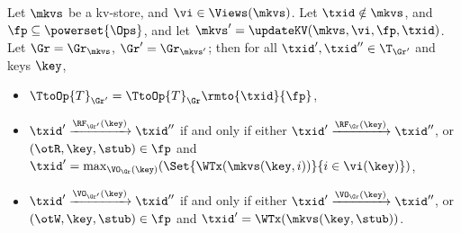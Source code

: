 \begin{lemma}
\label{lem:graph.update}
Let $\mkvs$ be a kv-store, and $\vi \in \Views(\mkvs)$. Let $\txid \notin \mkvs$, and 
$\fp \subseteq \powerset{\Ops}$, and let $\mkvs' = \updateKV(\mkvs, \vi, \fp, \txid)$. 
Let $\Gr = \Gr_{\mkvs}$, $\Gr' = \Gr_{\mkvs'}$; then for all $\txid', \txid'' \in \T_{\Gr'}$ and keys $\key$, 
\begin{itemize}
\item $\TtoOp{T}_{\Gr'} = \TtoOp{T}_{\Gr}\rmto{\txid}{\fp}$, 
\item $\txid' \xrightarrow{\RF_{\Gr'}(\key)} \txid''$ if and only if either 
$\txid' \xrightarrow{\RF_{\Gr}(\key)} \txid''$, or $(\otR, \key, \stub) \in \fp$ and 
$\txid' = \max_{\VO_{\Gr}(\key)}(\Set{\WTx(\mkvs(\key, i)) }{ i \in \vi(\key)})$, 
\item $\txid' \xrightarrow{\VO_{\Gr'}(\key)} \txid''$ if and only if either 
$\txid' \xrightarrow{\VO_{\Gr}(\key)} \txid''$, or $(\otW, \key, \stub) \in \fp$ 
and $\txid' = \WTx(\mkvs(\key, \stub))$. 
\end{itemize}
\end{lemma}

